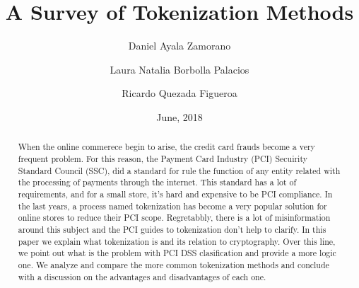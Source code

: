 \documentclass[11pt]{article}
\title{A Survey of Tokenization Methods}
\author{Daniel Ayala Zamorano
   \and Laura Natalia Borbolla Palacios
   \and Ricardo Quezada Figueroa}
\date{June, 2018}
\begin{document}
  \maketitle


  \begin{abstract}
    When the online commerece begin to arise, the credit card frauds become a
    very frequent problem. For this reason, the Payment Card Industry (PCI)
    Secuirity Standard Council (SSC), did a standard for rule the function of
    any entity related with the processing of payments through the internet.
    This standard has a lot of requirements, and for a small store, it's hard
    and expensive to be PCI compliance. In the last years, a process named
    tokenization has become a very popular solution for online stores to
    reduce their PCI scope. Regretabbly, there is a lot of misinformation
    around this subject and the PCI guides to tokenization don't help to
    clarify. In this paper we explain what tokenization is and its
    relation to cryptography. Over this line, we point out what is the problem
    with PCI DSS clasification and provide a more logic one. We analyze and
    compare the more common tokenization methods and conclude with a discussion
    on the advantages and disadvantages of each one.
  \end{abstract}
\end{document}
